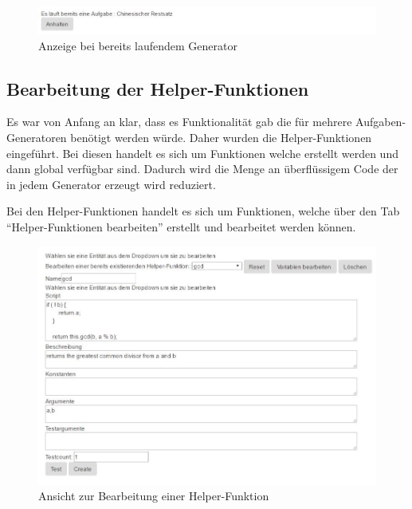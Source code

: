 \begin{figure}[htp]     %
\centering
\includegraphics[width=1\textwidth]{bilder/TaskRunning} 
\caption[Anzeige bei bereits laufendem Generator]{Anzeige bei bereits laufendem Generator}
\end{figure}


\subsection{Bearbeitung der Helper-Funktionen} \label{EditGenerator}

Es war von Anfang an klar, dass es Funktionalität gab die für mehrere Aufgaben-Generatoren benötigt werden würde. Daher wurden die Helper-Funktionen eingeführt. Bei diesen handelt es sich um Funktionen welche erstellt werden und dann global verfügbar sind. Dadurch wird die Menge an überflüssigem Code der in jedem Generator erzeugt wird reduziert.

Bei den Helper-Funktionen handelt es sich um Funktionen, welche über den Tab ``Helper-Funktionen bearbeiten'' erstellt und bearbeitet werden können. \\

\begin{figure}[htp]     %
\centering
\includegraphics[width=1\textwidth]{bilder/EditHelper} 
\caption[Ansicht zur Bearbeitung einer Helper-Funktion]{Ansicht zur Bearbeitung einer Helper-Funktion}
\end{figure} 

